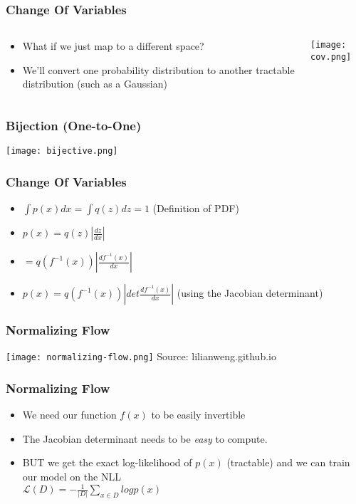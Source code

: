 \begin{frame}
    \frametitle{Change Of Variables}
    \begin{columns}
        \begin{column}{0.49\paperwidth}
            \begin{itemize}
                \item What if we just map to a different space?
                \item We'll convert one probability distribution to another
                    tractable distribution (such as a Gaussian)
            \end{itemize}
        \end{column}
        \begin{column}{0.49\paperwidth}
            \center\texttt{[image: cov.png]}
        \end{column}
    \end{columns}
\end{frame}

\begin{frame}
    \frametitle{Bijection (One-to-One)}
    \hspace{-1em}\center\texttt{[image: bijective.png]}
\end{frame}

\begin{frame}
    \frametitle{Change Of Variables}
    \begin{itemize}
        \item<1-> $\int p(x)dx = \int q(z)dz = 1$ (Definition of PDF)
        \item<2-> $p(x) = q(z) \left | \frac{dz}{dx} \right |$
        \item<3-> $= q(f^{-1}(x))\left | \frac{df^{-1}(x)}{dx}\right |$
        \item<4-> $p(x) = q(f^{-1}(x))\left | det\frac{df^{-1}(x)}{dx} \right |$
            (using the Jacobian determinant)
    \end{itemize}
\end{frame}

\begin{frame}
    \frametitle{Normalizing Flow}
    \center\texttt{[image: normalizing-flow.png]}
    \tiny{Source: lilianweng.github.io}
\end{frame}

\begin{frame}
    \frametitle{Normalizing Flow}
    \begin{itemize}
        \item We need our function $f(x)$ to be easily invertible
        \item The Jacobian determinant needs to be \textit{easy} to compute.
        \item BUT we get the exact log-likelihood of $p(x)$ (tractable) and we
            can train our model on the NLL \\$\mathcal{L}(D) = -\frac{1}{|D|}
            \sum\limits_{x\in D} log{p(x)}$
    \end{itemize}
\end{frame}
